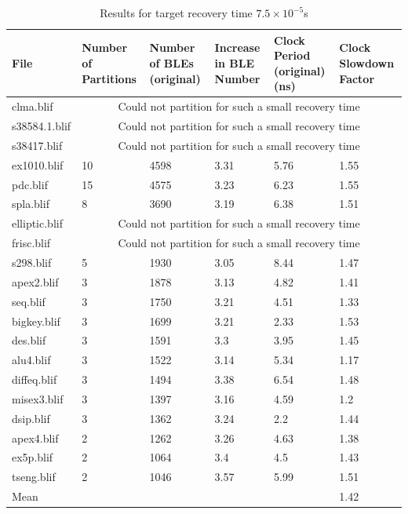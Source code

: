 \documentclass[12pt,final,oneside]{dwThesis} %
\begin{document}
      \begin{table} \footnotesize \begin{adjustwidth}{-1cm}{-1.2cm}
            \begin{tabularx}{1.1\textwidth}{XXXXXX} \toprule File & Number of
               Partitions &  Number of BLEs (original) &  Increase in BLE
               Number &  Clock Period (original) (ns) &  Clock Slowdown
               Factor\\ \midrule clma.blif      &  \multicolumn{5}{c}{Could not
                  partition for such a small recovery time}\\ s38584.1.blif  &
               \multicolumn{5}{c}{Could not partition for such a small recovery
                  time}\\ s38417.blif    &   \multicolumn{5}{c}{Could not
                  partition for such a small recovery time}\\ ex1010.blif    &
               10 & 4598 & 3.31 & 5.76 & 1.55\\ pdc.blif       & 15 & 4575 &
               3.23 & 6.23 & 1.55\\ spla.blif      & 8 & 3690 & 3.19 & 6.38 &
               1.51\\ elliptic.blif  &  \multicolumn{5}{c}{Could not partition
                  for such a small recovery time}\\ frisc.blif &
               \multicolumn{5}{c}{Could not partition for such a small recovery
                  time}\\ s298.blif      & 5 & 1930 & 3.05 & 8.44 & 1.47\\
               apex2.blif     & 3 & 1878 & 3.13 & 4.82 & 1.41\\ seq.blif
               & 3 & 1750 & 3.21 & 4.51 & 1.33\\ bigkey.blif    & 3 & 1699 &
               3.21 & 2.33 & 1.53\\ des.blif       & 3 & 1591 & 3.3 & 3.95 &
               1.45\\ alu4.blif      & 3 & 1522 & 3.14 & 5.34 & 1.17\\
               diffeq.blif    & 3 & 1494 & 3.38 & 6.54 & 1.48\\ misex3.blif
               & 3 & 1397 & 3.16 & 4.59 & 1.2\\ dsip.blif      & 3 & 1362 &
               3.24 & 2.2 & 1.44\\ apex4.blif     & 2 & 1262 & 3.26 & 4.63 &
               1.38\\ ex5p.blif      & 2 & 1064 & 3.4 & 4.5 & 1.43\\ tseng.blif
               & 2 & 1046 & 3.57 & 5.99 & 1.51\\ Mean &         &           &
               &          & 1.42\\

\bottomrule \end{tabularx} \caption{Results for target recovery time
$7.5\times10^{-5}$s} \label{Results7.5e-5} \end{adjustwidth} \end{table}
   
\end{document}
